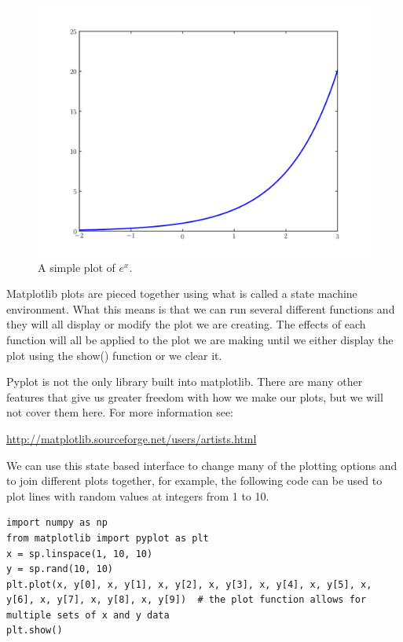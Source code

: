 \begin{figure}
\includegraphics[width=\textwidth]{expplot.pdf}
\caption{A simple plot of $e^x$.}
\label{mpl:expplot}
\end{figure}

Matplotlib plots are pieced together using what is called a state machine environment. What this means is that we can run several different functions and they will all display or modify the plot we are creating. The effects of each function will all be applied to the plot we are making until we either display the plot using the show() function or we clear it.

Pyplot is not the only library built into matplotlib. There are many other features that give us greater freedom with how we make our plots, but we will not cover them here. For more information see: 

\url{http://matplotlib.sourceforge.net/users/artists.html}

We can use this state based interface to change many of the plotting options and to join different plots together, for example, the following code can be used to plot lines with random values at integers from 1 to 10.

\begin{lstlisting}
import numpy as np
from matplotlib import pyplot as plt
x = sp.linspace(1, 10, 10)
y = sp.rand(10, 10)
plt.plot(x, y[0], x, y[1], x, y[2], x, y[3], x, y[4], x, y[5], x, y[6], x, y[7], x, y[8], x, y[9])  # the plot function allows for multiple sets of x and y data
plt.show()
\end{lstlisting}

